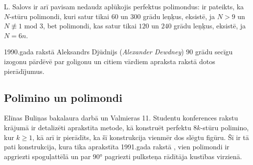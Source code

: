 \documentclass[utf8]{ludis2022}
\begin{document}
L. Salovs ir arī pavisam nedaudz aplūkojis perfektus polimondus: ir pateikts, ka $N$-stūru polimondi, kuri satur tikai $60$ un $300$ grādu leņķus, eksistē, ja $N>9$ un $N\not\equiv 1$ mod $3$, bet polimondi, kas satur tikai $120$ un $240$ grādu leņķus, eksistē, ja $N=6n$. 


1990.gada rakstā \cite{dewdney1990odd} Aleksandrs Djūdnijs ({\em Alexander Dewdney}) $90$ grādu secīgu izogonu pārdēvē par goligonu un citiem vārdiem apraksta  rakstā \cite{sallows1991serial} dotos pierādījumus.

\subsection{Polimino un polimondi}


\firstparskip Elīnas Buliņas bakalaura darbā \cite{bulicna2016magiskie} un Valmieras 11. Studentu konferences rakstu krājumā \cite{bulicna2017magiskie} ir detalizēti aprakstīta metode, kā konstruēt perfektu $8k$-stūru polimino, kur $k \geq 1$, kā arī ir pierādīts, ka šī konstrukcija vienmēr dos slēgtu figūru. Šī ir tā pati konstrukcija, kura tika aprakstīta 1991.gada rakstā \cite{sallows1991serial}, vien polimondi ir apgriezti spoguļattēlā un par $90°$ pagriezti pulksteņa rādītāja kustības virzienā. 
\end{document}
